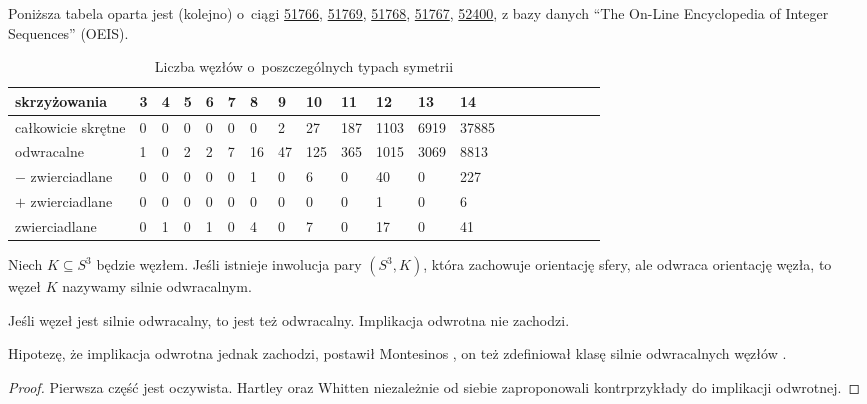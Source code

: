 Poniższa tabela oparta jest (kolejno) o~ciągi
\href{https://oeis.org/A051766}{51766},
\href{https://oeis.org/A051769}{51769},
\href{https://oeis.org/A051768}{51768},
\href{https://oeis.org/A051767}{51767},
\href{https://oeis.org/A052400}{52400},
z bazy danych ``The On-Line Encyclopedia of Integer Sequences'' (OEIS).

\begin{table}[h]
    \centering
    \begin{tabular}{@{}*{20}l@{}} \toprule
        skrzyżowania & 3 & 4 & 5 & 6 & 7 & 8 & 9 & 10 & 11 & 12 & 13 & 14 \\ \midrule
        całkowicie skrętne & 0 & 0 & 0 & 0 & 0 & 0 & 2 & 27 & 187 & 1103 & 6919 & 37885 \\
        odwracalne & 1 & 0 & 2 & 2 & 7 & 16 & 47 & 125 & 365 & 1015 & 3069 & 8813 \\
        $-$ zwierciadlane & 0 & 0 & 0 & 0 & 0 & 1 & 0 & 6 & 0 & 40 & 0 & 227 \\
        $+$ zwierciadlane & 0 & 0 & 0 & 0 & 0 & 0 & 0 & 0 & 0 & 1 & 0 & 6 \\
        zwierciadlane & 0 & 1 & 0 & 1 & 0 & 4 & 0 & 7 & 0 & 17 & 0 & 41 \\
        \bottomrule
        \hline
    \end{tabular}
    \caption{Liczba węzłów o~poszczególnych typach symetrii}
\end{table}

\begin{definition}
    Niech $K \subseteq S^3$ będzie węzłem.
    Jeśli istnieje inwolucja pary $(S^3, K)$, która zachowuje orientację sfery, ale odwraca orientację węzła, to węzeł $K$ nazywamy silnie odwracalnym.
\end{definition}

\begin{proposition}
    Jeśli węzeł jest silnie odwracalny, to jest też odwracalny.
    Implikacja odwrotna nie zachodzi.
\end{proposition}

Hipotezę, że implikacja odwrotna jednak zachodzi, postawił Montesinos \cite[problem 1.6]{kirby78}, on też zdefiniował klasę silnie odwracalnych węzłów \cite{montesinos75}.
%

\begin{proof}
%
%
    Pierwsza część jest oczywista.
    Hartley \cite{hartley80} oraz Whitten \cite{whitten81} niezależnie od siebie zaproponowali kontrprzykłady do implikacji odwrotnej.
\end{proof}

